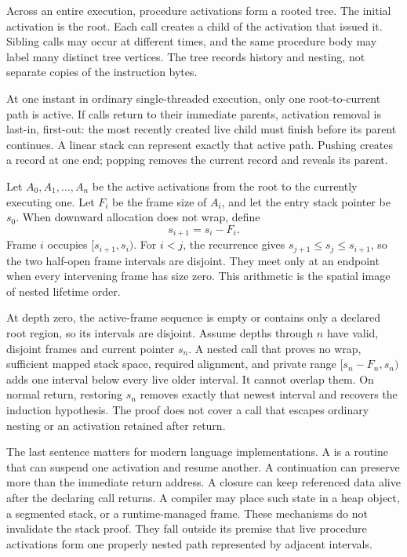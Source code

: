 Across an entire execution, procedure activations form a rooted tree. The
initial activation is the root. Each call creates a child of the activation
that issued it. Sibling calls may occur at different times, and the same
procedure body may label many distinct tree vertices. The tree records
history and nesting, not separate copies of the instruction bytes.

At one instant in ordinary single-threaded execution, only one root-to-current
path is active. If calls return to their immediate parents, activation removal
is last-in, first-out: the most recently created live child must finish before
its parent continues. A linear stack can represent exactly that active path.
Pushing creates a record at one end; popping removes the current record and
reveals its parent.

Let \(A_0,A_1,\ldots,A_n\) be the active activations from the root to the
currently executing one. Let \(F_i\) be the frame size of \(A_i\), and let
the entry stack pointer be \(s_0\). When downward allocation does not wrap,
define
\[
  s_{i+1}=s_i-F_i.
\]
Frame \(i\) occupies \([s_{i+1},s_i)\). For \(i<j\), the recurrence gives
\(s_{j+1}\le s_j\le s_{i+1}\), so the two half-open frame intervals are
disjoint. They meet only at an endpoint when every intervening frame has size
zero. This arithmetic is the spatial image of nested lifetime order.

\begin{proofkit}[title={Induction over call depth}]
At depth zero, the active-frame sequence is empty or contains only a declared
root region, so its intervals are disjoint. Assume depths through \(n\) have
valid, disjoint frames and current pointer \(s_n\). A nested call that proves
no wrap, sufficient mapped stack space, required alignment, and private range
\([s_n-F_n,s_n)\) adds one interval below every live older interval. It cannot
overlap them. On normal return, restoring \(s_n\) removes exactly that newest
interval and recovers the induction hypothesis. The proof does not cover a
call that escapes ordinary nesting or an activation retained after return.
\end{proofkit}

The last sentence matters for modern language implementations. A
 is a routine that can suspend one activation and resume
another. A continuation can preserve more
than the immediate return address. A closure can keep referenced data alive
after the declaring call returns. A compiler may place such state in a heap
object, a segmented stack, or a runtime-managed frame. These mechanisms do not
invalidate the stack proof. They fall outside its premise that live procedure
activations form one properly nested path represented by adjacent intervals.


